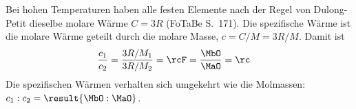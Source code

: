 Bei hohen Temperaturen haben alle festen Elemente nach der Regel von Dulong-Petit dieselbe molare Wärme $C = 3R$ (FoTaBe S.~171). Die spezifische Wärme ist die molare Wärme geteilt durch die molare Masse, $c = C/M = 3R/M$. Damit ist
\begin{align}
 \frac{c_1}{c_2} &= \frac{3R/M_1}{3R/M_2} = \rcF = \frac{\MbO}{\MaO} = \rc
\end{align}
Die spezifischen Wärmen verhalten sich umgekehrt wie die Molmassen: $c_1 : c_2 = \result{\MbO : \MaO}$.
